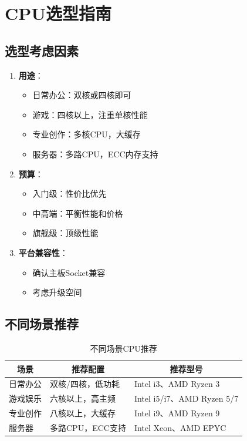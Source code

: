 \documentclass[12pt,UTF8]{ctexbook}
\begin{document}
\chapter{CPU选型指南}

\section{选型考虑因素}

\begin{enumerate}
    \item \textbf{用途}：
    \begin{itemize}[leftmargin=2em]
        \item 日常办公：双核或四核即可
        \item 游戏：四核以上，注重单核性能
        \item 专业创作：多核CPU，大缓存
        \item 服务器：多路CPU，ECC内存支持
    \end{itemize}
    
    \item \textbf{预算}：
    \begin{itemize}[leftmargin=2em]
        \item 入门级：性价比优先
        \item 中高端：平衡性能和价格
        \item 旗舰级：顶级性能
    \end{itemize}
    
    \item \textbf{平台兼容性}：
    \begin{itemize}[leftmargin=2em]
        \item 确认主板Socket兼容
        \item 考虑升级空间
    \end{itemize}
\end{enumerate}

\section{不同场景推荐}

\begin{table}[H]
    \centering
    \begin{tabularx}{\textwidth}{|p{3cm}|X|X|}
        \hline
        \multicolumn{1}{|c|}{\textbf{场景}} & \multicolumn{1}{c|}{\textbf{推荐配置}} & \multicolumn{1}{c|}{\textbf{推荐型号}} \\
        \hline
        日常办公 & 双核/四核，低功耗 & Intel i3、AMD Ryzen 3 \\
        \hline
        游戏娱乐 & 六核以上，高主频 & Intel i5/i7、AMD Ryzen 5/7 \\
        \hline
        专业创作 & 八核以上，大缓存 & Intel i9、AMD Ryzen 9 \\
        \hline
        服务器 & 多路CPU，ECC支持 & Intel Xeon、AMD EPYC \\
        \hline
    \end{tabularx}
    \caption{不同场景CPU推荐}
    \label{tab:cpu_recommendations}
\end{table}
\end{document}
